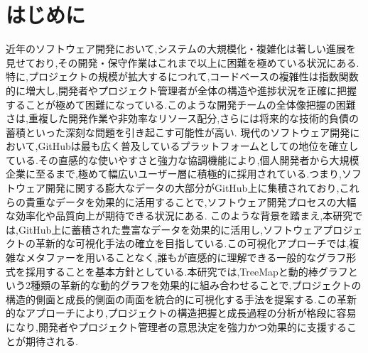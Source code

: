 \documentclass[12pt,twoside]{jbook}
\begin{document}
\begin{acknowledgments}


\end{acknowledgments}


\tableofcontents       %

%
%

\listoffigures         %
\listoftables          %


%
%
\chapter{はじめに}
近年のソフトウェア開発において,システムの大規模化・複雑化は著しい進展を見せており,その開発・保守作業はこれまで以上に困難を極めている状況にある.特に,プロジェクトの規模が拡大するにつれて,コードベースの複雑性は指数関数的に増大し,開発者やプロジェクト管理者が全体の構造や進捗状況を正確に把握することが極めて困難になっている.このような開発チームの全体像把握の困難さは,重複した開発作業や非効率なリソース配分,さらには将来的な技術的負債の蓄積といった深刻な問題を引き起こす可能性が高い.
現代のソフトウェア開発において,GitHubは最も広く普及しているプラットフォームとしての地位を確立している.その直感的な使いやすさと強力な協調機能により,個人開発者から大規模企業に至るまで,極めて幅広いユーザー層に積極的に採用されている.つまり,ソフトウェア開発に関する膨大なデータの大部分がGitHub上に集積されており,これらの貴重なデータを効果的に活用することで,ソフトウェア開発プロセスの大幅な効率化や品質向上が期待できる状況にある.
このような背景を踏まえ,本研究では,GitHub上に蓄積された豊富なデータを効果的に活用し,ソフトウェアプロジェクトの革新的な可視化手法の確立を目指している.この可視化アプローチでは,複雑なメタファーを用いることなく,誰もが直感的に理解できる一般的なグラフ形式を採用することを基本方針としている.本研究では,TreeMapと動的棒グラフという2種類の革新的な動的グラフを効果的に組み合わせることで,プロジェクトの構造的側面と成長的側面の両面を統合的に可視化する手法を提案する.この革新的なアプローチにより,プロジェクトの構造把握と成長過程の分析が格段に容易になり,開発者やプロジェクト管理者の意思決定を強力かつ効果的に支援することが期待される.
\end{document}
